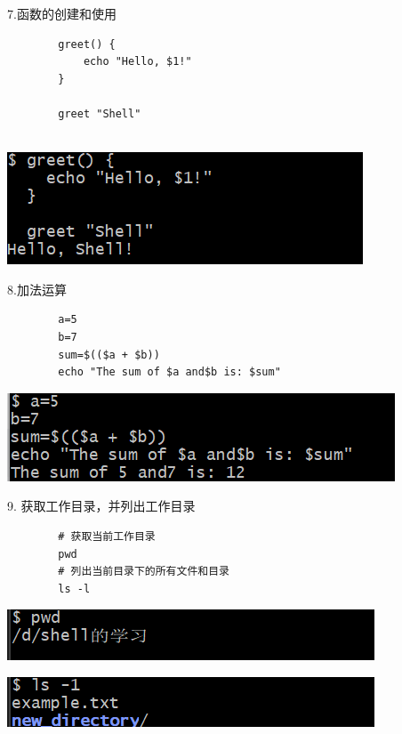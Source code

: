 \documentclass{article}
\begin{document}
	7.函数的创建和使用
	\begin{verbatim}
		greet() {
			echo "Hello, $1!"
		}
		
		greet "Shell"
		
	\end{verbatim}
	
	\noindent
	\begin{minipage}{\linewidth}
		\centering
		\includegraphics[width=0.5\linewidth]{example7.png}
		\label{fig:example}
	\end{minipage}
	
	8.加法运算
	\begin{verbatim}
		a=5
		b=7
		sum=$(($a + $b))
		echo "The sum of $a and$b is: $sum"
	\end{verbatim}
	
	
	
	\noindent
	\begin{minipage}{\linewidth}
		\centering
		\includegraphics[width=0.5\linewidth]{example8.png}
		\label{fig:example}
	\end{minipage}
	
	9. 获取工作目录，并列出工作目录
	\begin{verbatim}
		# 获取当前工作目录
		pwd
		# 列出当前目录下的所有文件和目录
		ls -l
	\end{verbatim}
	
	\noindent
	\begin{minipage}{\linewidth}
		\centering
		\includegraphics[width=0.5\linewidth]{example9.1.png}
	\end{minipage}
	\noindent
	\begin{minipage}{\linewidth}
		\centering
		\includegraphics[width=0.5\linewidth]{example9.2.png}
		\label{fig:example}
	\end{minipage}
	
\end{document}
